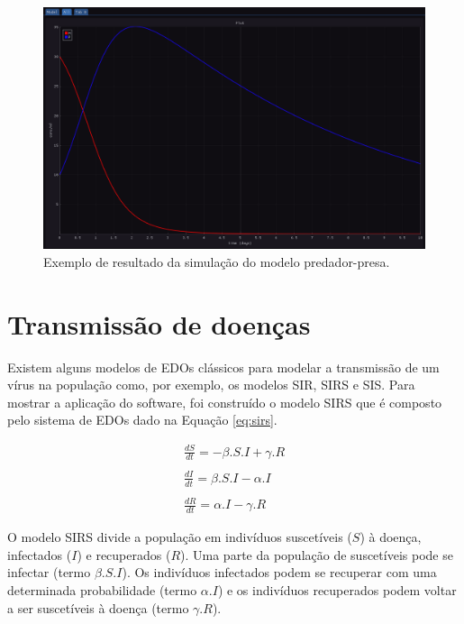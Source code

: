 \documentclass[
	12pt,				%
	openright,			%
	oneside,			%
	a4paper,			%
	main=brazil,
	english,			%
	]{ufsj-abntex2}
\begin{document}
\begin{figure}[h]
    \centering
    \includegraphics[width=\textwidth]{imgs/modelos/resultado-predador-presa.png} 
    \caption{Exemplo de resultado da simulação do modelo predador-presa.}
    \label{fig:resultado-predador-presa}
\end{figure}


\section{Transmissão de doenças}
Existem alguns modelos de EDOs clássicos para modelar a transmissão de um vírus na população como, por exemplo, os modelos SIR, SIRS e SIS. Para mostrar a aplicação do software, foi construído o modelo SIRS que é composto pelo sistema de EDOs dado na Equação \ref{eq:sirs}. 

\begin{equation}\label{eq:sirs}
    \begin{array}{lr}
    \frac{dS}{dt} = -\beta.S.I + \gamma.R
    \\
    \\
    \frac{dI}{dt} = \beta.S.I - \alpha.I
    \\
    \\ 
    \frac{dR}{dt} = \alpha.I - \gamma.R
    \end{array}
\end{equation}

O modelo SIRS divide a população em indivíduos suscetíveis ($S$) à doença, infectados ($I$) e recuperados ($R$). Uma parte da população de suscetíveis pode se infectar (termo $\beta.S.I$). Os indivíduos infectados podem se recuperar com uma determinada probabilidade (termo $\alpha.I$) e os indivíduos recuperados podem voltar a ser suscetíveis à doença (termo $\gamma.R$).  
\end{document}
